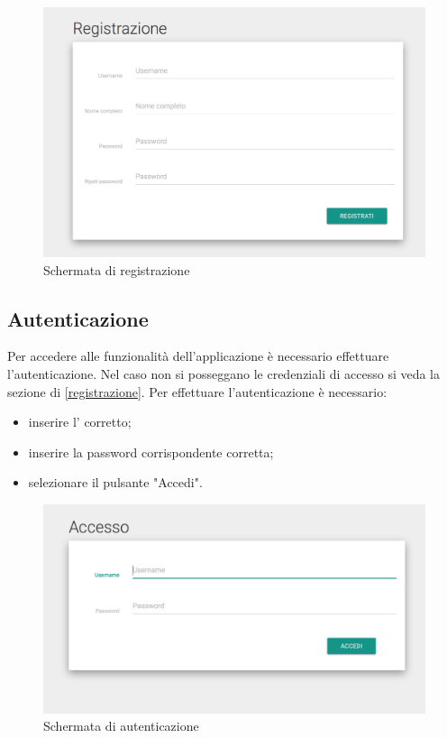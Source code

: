 \documentclass[12pt,a4paper]{article}
\begin{document}
\begin{figure}[h]
		
\centering
\includegraphics[width=0.8\linewidth]{../img/screenshot/signup.png}
\caption{Schermata di registrazione}
\label{Schermata di registrazione}
\end{figure}


	\subsection{Autenticazione}\label{autenticazione}
	Per accedere alle funzionalità dell'applicazione è necessario effettuare l'autenticazione. Nel caso non si posseggano le credenziali di accesso si veda la sezione di \ref{registrazione}.
	Per effettuare l'autenticazione è necessario:
	\begin{itemize}
		\item inserire l' corretto;
		\item inserire la password corrispondente corretta;
		\item selezionare il pulsante "Accedi".
	\end{itemize}
	
		\begin{figure}[h]
		
		\centering
		\includegraphics[width=0.8\linewidth]{../img/screenshot/loginCrop.png}
		\caption{Schermata di autenticazione}
		\label{Schermata di autenticazione}
		\end{figure}
		
\end{document}

